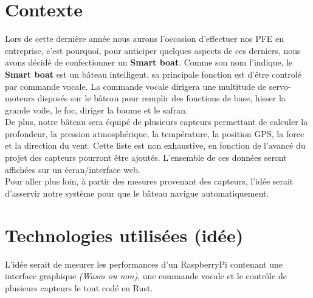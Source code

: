 \section{Contexte}

Lors de cette dernière année nous aurons l'occasion d'effectuer nos PFE en entreprise, c'est pourquoi, pour anticiper quelques aspects de ces derniers, nous avons décidé de confectionner un \textbf{Smart boat}. Comme son nom l'indique, le \textbf{Smart boat} est un bâteau intelligent, sa principale fonction est d'être controlé par commande vocale.
La commande vocale dirigera une multitude de servo-moteurs disposés sur le bâteau pour remplir des fonctions de base, hisser la grande voile, le foc, diriger la baume et le safran. \\

De plus, notre bâteau sera équipé de plusieurs capteurs permettant de calculer la profondeur, la pression atmosphérique, la température, la position GPS, la force et la direction du vent. Cette liste est non exhaustive, en fonction de l'avancé du projet des capteurs pourront être ajoutés. L'ensemble de ces données seront affichées sur un écran/interface web.\\

Pour aller plus loin, à partir des mesures provenant des capteurs, l'idée serait d'asservir notre système pour que le bâteau navigue automatiquement.

\section{Technologies utilisées (idée)}

L'idée serait de mesurer les performances d'un RaspberryPi contenant une interface graphique \textit{(Wasm ou non)}, une commande vocale et le contrôle de plusieurs capteurs le tout codé en Rust.
\vspace{.3cm}

